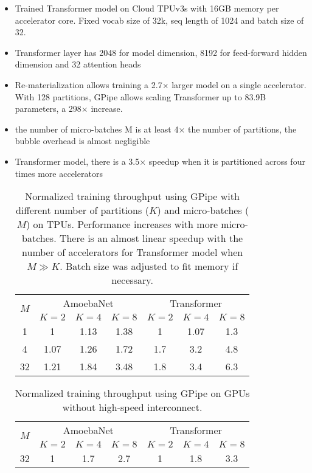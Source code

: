\documentclass[12pt]{article}
\begin{document}
\begin{itemize}
  \item Trained Transformer model on Cloud TPUv3s with 16GB memory per accelerator core. Fixed vocab size of 32k, seq length of 1024 and batch size of 32.
  \item Transformer layer has 2048 for model dimension, 8192 for feed-forward hidden dimension and 32 attention heads
  \item Re-materialization allows training a 2.7× larger model on a single accelerator. With 128 partitions, GPipe allows scaling Transformer up to 83.9B parameters, a 298× increase.
  \item the number of micro-batches M is at least 4× the number of partitions, the bubble overhead is almost negligible
  \item Transformer model, there is a 3.5× speedup when it is partitioned across four times more accelerators
  \begin{table}[H]
\centering
\caption{Normalized training throughput using GPipe with different number of partitions ($K$) and micro-batches ($M$) on TPUs. Performance increases with more micro-batches. There is an almost linear speedup with the number of accelerators for Transformer model when $M \gg K$. Batch size was adjusted to fit memory if necessary.}
\begin{tabular}{|c|c|c|c|c|c|c|}
\hline
\multirow{2}{*}{$M$} & \multicolumn{3}{c|}{AmoebaNet} & \multicolumn{3}{c|}{Transformer} \\
\cline{2-7}
 & $K=2$ & $K=4$ & $K=8$ & $K=2$ & $K=4$ & $K=8$ \\
\hline
1  & 1    & 1.13 & 1.38 & 1   & 1.07 & 1.3 \\
4  & 1.07 & 1.26 & 1.72 & 1.7 & 3.2  & 4.8 \\
32 & 1.21 & 1.84 & 3.48 & 1.8 & 3.4  & 6.3 \\
\hline
\end{tabular}
\end{table}
\begin{table}[H]
\centering
\caption{Normalized training throughput using GPipe on GPUs without high-speed interconnect.}
\begin{tabular}{|c|c|c|c|c|c|c|}
\hline
\multirow{2}{*}{$M$} & \multicolumn{3}{c|}{AmoebaNet} & \multicolumn{3}{c|}{Transformer} \\
\cline{2-7}
 & $K=2$ & $K=4$ & $K=8$ & $K=2$ & $K=4$ & $K=8$ \\
\hline
32 & 1 & 1.7 & 2.7 & 1 & 1.8 & 3.3 \\
\hline
\end{tabular}

\end{table}
\end{itemize}
\end{document}
